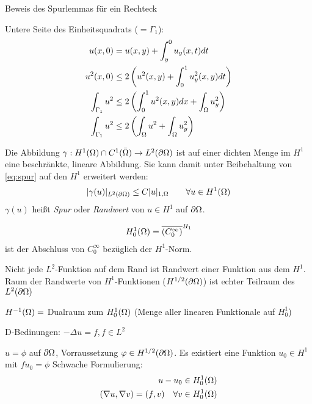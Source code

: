 \begin{beweis} Beweis des Spurlemmas für ein Rechteck

Untere Seite des Einheitsquadrats ($= \Gamma_1$):
\begin{align*}
    u(x,0) &= u(x,y) + \int_y^0 u_y(x,t) dt\\
    u^2(x,0) &\leq 2 \left( u^2(x,y) + \int_0^1u^2_y (x,y) dt\right)\\
      \int_{\Gamma_1} u^2 &\leq 2 \left( \int_0^1u^2(x,y) dx + \int_{\Omega}u^2_y\right)\\
   \int_{\Gamma_1} u^2 &\leq 2 \left( \int_\Omega u^2 + \int_{\Omega}u^2_y\right)
  \end{align*}
\end{beweis}
\begin{folgerung}
  Die Abbildung $\gamma: H^1(\Omega) \cap C^1(\bar {\Omega}) \to L^2(\partial \Omega)$ ist auf einer dichten Menge im $H^1$ eine beschränkte, lineare Abbildung. Sie kann damit unter Beibehaltung von \eqref{eq:spur} auf den $H^1$ erweitert werden:
  \begin{align*}
    |\gamma(u)|_{L^2(\partial \Omega)} \leq C |u|_{1,\Omega} \qquad \forall u \in H^1(\Omega)
  \end{align*}
$\gamma(u)$ heißt \emph{Spur} oder \emph{Randwert} von $u \in H^1$ auf $\partial \Omega$.
\end{folgerung}

\begin{definition}
  \begin{align*}
    H_0^1(\Omega) = \overline{(C^\infty_0)}^{H_1}
  \end{align*}
ist der Abschluss von $C_0^\infty$ bezüglich der $H^1$-Norm.
\end{definition}
\begin{bemerkung}
  Nicht jede $L^2$-Funktion auf dem Rand ist Randwert einer Funktion aus dem $H^1$. Raum der Randwerte von $H^1$-Funktionen ($H^{1/2}(\partial \Omega)$) ist echter Teilraum des $L^2(\partial \Omega)$ 
\end{bemerkung}
\begin{definition}
  $  H^{-1} (\Omega)  = $ Dualraum zum $H_0^1(\Omega)$
(Menge aller linearen Funktionale auf $H_0^1$)
\end{definition}

D-Bedinungen: $-\Delta u = f, f \in L^2$

$u = \phi$ auf $\partial \Omega$, Vorraussetzung $\varphi \in H^{1/2}(\partial \Omega)$. Es existiert eine Funktion $u_0 \in H^1$ mit $f u_0 = \phi$
Schwache Formulierung:
\begin{align*}
  u-u_0 \in H_0^1(\Omega)\\
(\nabla u, \nabla v)= (f, v) \quad \forall v\in H_0^1 (\Omega)
\end{align*}

